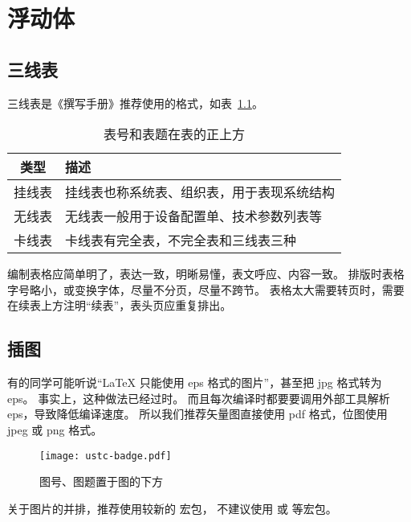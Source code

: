 
\chapter{浮动体}

\section{三线表}

三线表是《撰写手册》推荐使用的格式，如表~\ref{tab:exampletable}。
\begin{table}[htb]
  \centering
  \caption{表号和表题在表的正上方}
  \label{tab:exampletable}
  \begin{tabular}{cl}
    \toprule
    类型   & 描述                                       \\
    \midrule
    挂线表 & 挂线表也称系统表、组织表，用于表现系统结构 \\
    无线表 & 无线表一般用于设备配置单、技术参数列表等   \\
    卡线表 & 卡线表有完全表，不完全表和三线表三种       \\
    \bottomrule
  \end{tabular}
\end{table}

编制表格应简单明了，表达一致，明晰易懂，表文呼应、内容一致。
排版时表格字号略小，或变换字体，尽量不分页，尽量不跨节。
表格太大需要转页时，需要在续表上方注明“续表”，表头页应重复排出。



\section{插图}

有的同学可能听说“\LaTeX{} 只能使用 eps 格式的图片”，甚至把 jpg 格式转为 eps。
事实上，这种做法已经过时。
而且每次编译时都要要调用外部工具解析 eps，导致降低编译速度。
所以我们推荐矢量图直接使用 pdf 格式，位图使用 jpeg 或 png 格式。
\begin{figure}[htb]
  \centering
  \texttt{[image: ustc-badge.pdf]}
  \caption{图号、图题置于图的下方}
  \label{fig:badge}
\end{figure}

关于图片的并排，推荐使用较新的  宏包，
不建议使用  或  等宏包。



